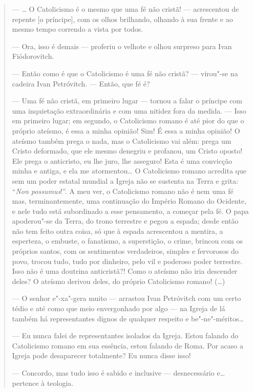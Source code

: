 \begin{quotation}
--- \ldots{} O Catolicismo é o mesmo que uma fé não cristã! --- acrescentou de repente [o príncipe], com os olhos brilhando, olhando à sua frente e ao mesmo tempo correndo a vista por todos.

--- Ora, isso é demais --- proferiu o velhote e olhou surpreso para Ivan Fiódorovitch.

--- Então como é que o Catolicismo é uma fé não cristã? --- virou"-se na cadeira Ivan Petróvitch. --- Então, que fé é?

--- Uma fé não cristã, em primeiro lugar --- tornou a falar o príncipe com uma inquietação extraordinária e com uma nitidez fora da medida. --- Isso em primeiro lugar; em segundo, o Catolicismo romano é até pior do que o próprio ateísmo, é essa a minha opinião! Sim! É essa a minha opinião! O ateísmo também prega o nada, mas o Catolicismo vai além: prega um Cristo deformado, que ele mesmo denegriu e profanou, um Cristo oposto! Ele prega o anticristo, eu lhe juro, lhe asseguro! Esta é uma convicção minha e antiga, e ela me atormentou\ldots{} O Catolicismo romano acredita que sem um poder estatal mundial a Igreja não se sustenta na
Terra e grita: ``\emph{Non possumus}!''. A meu ver, o Catolicismo romano não é nem uma fé mas, terminantemente, uma continuação do Império Romano do Ocidente, e nele tudo está subordinado a esse pensamento, a começar pela fé. O papa apoderou"-se da Terra, do trono terrestre e pegou a espada; desde então não tem feito outra coisa, só que à espada acrescentou a mentira, a esperteza, o embuste, o fanatismo, a superstição, o crime, brincou com os próprios santos, com os sentimentos verdadeiros, simples
e fervorosos do povo, trocou tudo, tudo por dinheiro, pelo vil e poderoso poder terrestre. Isso não é uma doutrina anticristã?! Como o ateísmo não iria descender deles? O ateísmo derivou deles, do próprio Catolicismo romano! (\ldots{})

--- O senhor e"-xa"-gera muito --- arrastou Ivan Petróvitch com um certo tédio e até como que meio envergonhado por algo --- na Igreja de lá também há representantes dignos de qualquer respeito e be"-ne"-méritos\ldots{}

--- Eu nunca falei de representantes isolados da Igreja. Estou falando do Catolicismo romano em sua essência, estou falando de Roma. Por acaso a Igreja pode desaparecer totalmente? Eu nunca disse isso!

--- Concordo, mas tudo isso é sabido e inclusive --- desnecessário e\ldots{} pertence à teologia.


\end{quotation}
